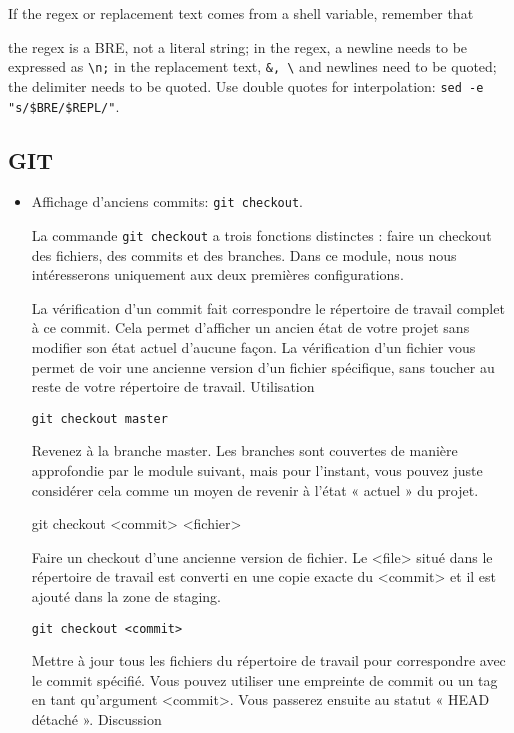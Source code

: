 \begin{itemize}
If the regex or replacement text comes from a shell variable, remember that

    the regex is a BRE, not a literal string;
    in the regex, a newline needs to be expressed as \verb=\n;=
    in the replacement text, \verb=&, \= and newlines need to be quoted;
    the delimiter needs to be quoted.
    Use double quotes for interpolation: \verb=sed -e "s/$BRE/$REPL/"=.


\end{itemize}

\subsection{GIT}

\begin{itemize}

\item Affichage d'anciens commits: \verb=git checkout=.

La commande \verb=git checkout= a trois fonctions distinctes : faire un checkout des fichiers, des commits et des branches. Dans ce module, nous nous intéresserons uniquement aux deux premières configurations.

La vérification d'un commit fait correspondre le répertoire de travail complet à ce commit. Cela permet d'afficher un ancien état de votre projet sans modifier son état actuel d'aucune façon. La vérification d'un fichier vous permet de voir une ancienne version d'un fichier spécifique, sans toucher au reste de votre répertoire de travail.
Utilisation

\begin{verbatim}
git checkout master
\end{verbatim}

Revenez à la branche master. Les branches sont couvertes de manière approfondie par le module suivant, mais pour l'instant, vous pouvez juste considérer cela comme un moyen de revenir à l'état « actuel » du projet.


git checkout <commit> <fichier>

Faire un checkout d'une ancienne version de fichier. Le <file> situé dans le répertoire de travail est converti en une copie exacte du <commit> et il est ajouté dans la zone de staging.

\begin{verbatim}
git checkout <commit>
\end{verbatim}

Mettre à jour tous les fichiers du répertoire de travail pour correspondre avec le commit spécifié. Vous pouvez utiliser une empreinte de commit ou un tag en tant qu'argument <commit>. Vous passerez ensuite au statut « HEAD détaché ».
Discussion


\end{itemize}
